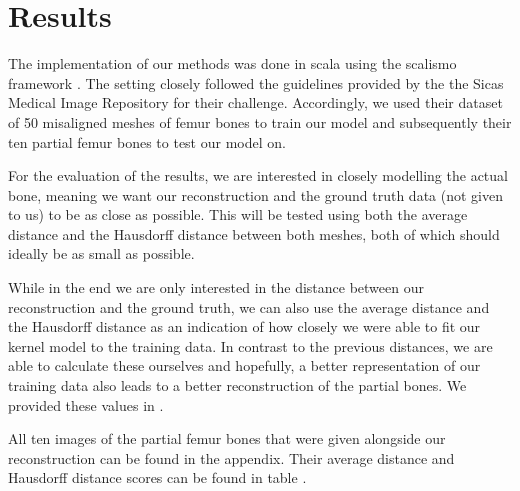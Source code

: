\section{Results}
\label{sec:results}

The implementation of our methods was done in scala using the scalismo framework . 
The setting closely followed the guidelines provided by the the Sicas Medical Image Repository for their  challenge. 
Accordingly, we used their dataset of 50 misaligned meshes of femur bones to train our model and subsequently their ten partial femur bones to test our model on. 

For the evaluation of the results, we are interested in closely modelling the actual bone, meaning we want our reconstruction and the ground truth data (not given to us) to be as close as possible. 
This will be tested using both the average distance and the Hausdorff distance between both meshes, both of which should ideally be as small as possible.

While in the end we are only interested in the distance between our reconstruction and the ground truth, we can also use the average distance and the Hausdorff distance as an indication of how closely we were able to fit our kernel model to the training data. 
In contrast to the previous distances, we are able to calculate these ourselves and hopefully, a better representation of our training data also leads to a better reconstruction of the partial bones. 
We provided these values in .

All ten images of the partial femur bones that were given alongside our reconstruction can be found in the appendix. 
Their average distance and Hausdorff distance scores can be found in table  .
